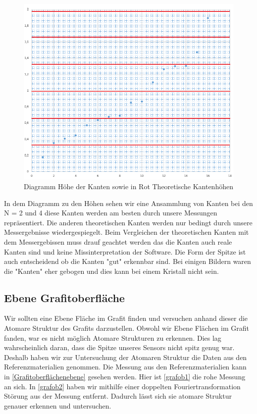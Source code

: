 \documentclass[10pt,a4paper]{article}
\begin{document}
\begin{figure}[]
	\includegraphics[scale = 0.5]{khgdia.png}
	\centering
	\caption{Diagramm Höhe der Kanten sowie in Rot Theoretische Kantenhöhen}
	\label{list}
\end{figure}

In dem Diagramm zu den Höhen sehen wir eine Ansammlung von Kanten bei den N = 2 und 4 diese Kanten werden am besten durch unsere Messungen repräsentiert. Die anderen theoretischen Kanten werden nur bedingt durch unsere Messergebnisse wiedergespiegelt.
Beim Vergleichen der theoretischen Kanten mit dem Messergebissen muss drauf geachtet werden das die Kanten auch reale Kanten sind und keine Missinterpretation der Software. Die Form der Spitze ist auch entscheidend ob die Kanten "gut" erkennbar sind. Bei einigen Bildern waren die "Kanten" eher gebogen und dies kann bei einem Kristall nicht sein.

\subsection{Ebene Grafitoberfläche}

Wir sollten eine Ebene Fläche im Grafit finden und versuchen anhand dieser die Atomare Struktur des Grafits darzustellen. Obwohl wir Ebene Flächen im Grafit fanden, war es nicht möglich Atomare Strukturen zu erkennen. Dies lag wahrscheinlich daran, dass die Spitze unseres Sensors nicht spitz genug war. Deshalb haben wir zur Untersuchung der Atomaren Struktur die Daten aus den Referenzmaterialien genommen. Die Messung aus den Referenzmaterialien kann in \ref{Grafitoberflächenebene} gesehen werden. Hier ist \ref{grafob1} die rohe Messung an sich. In \ref{grafob2} haben wir mithilfe einer doppelten Fouriertransformation Störung aus der Messung entfernt. Dadurch lässt sich sie atomare Struktur genauer erkennen und untersuchen.
\end{document}
